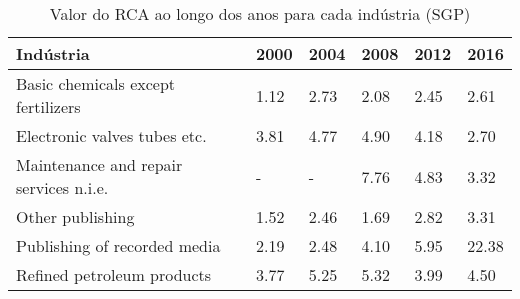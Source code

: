 \begin{table}
\centering
\caption{Valor do RCA ao longo dos anos para cada indústria (SGP)}
\begin{tabular}{p{6cm}p{1.5cm}p{1.5cm}p{1.5cm}p{1.5cm}p{1.5cm}}
\toprule
                             Indústria & 2000 & 2004 & 2008 & 2012 &  2016 \\
\midrule
    Basic chemicals except fertilizers & 1.12 & 2.73 & 2.08 & 2.45 &  2.61 \\
          Electronic valves tubes etc. & 3.81 & 4.77 & 4.90 & 4.18 &  2.70 \\
Maintenance and repair services n.i.e. &    - &    - & 7.76 & 4.83 &  3.32 \\
                      Other publishing & 1.52 & 2.46 & 1.69 & 2.82 &  3.31 \\
          Publishing of recorded media & 2.19 & 2.48 & 4.10 & 5.95 & 22.38 \\
            Refined petroleum products & 3.77 & 5.25 & 5.32 & 3.99 &  4.50 \\
\bottomrule
\end{tabular}
\end{table}
